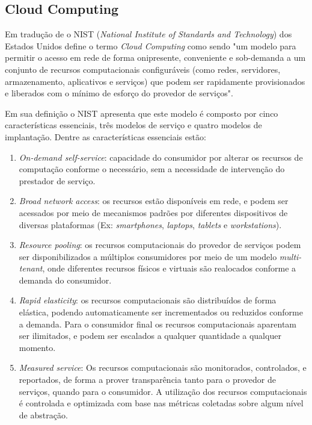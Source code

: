 \subsection{Cloud Computing}
Em tradução de \cite{2019:Sehgal} o NIST
(\emph{National Institute of Standards and Technology}) dos Estados Unidos
define o termo \emph{Cloud Computing} como sendo "um modelo para permitir
o acesso em rede de forma onipresente, conveniente e sob-demanda
a um conjunto de recursos computacionais configuráveis (como redes,
servidores, armazenamento, aplicativos e serviços) que podem ser
rapidamente provisionados e liberados com o mínimo de esforço do provedor
de serviços".

Em sua definição o NIST apresenta que este modelo é composto
por cinco características essenciais, três modelos de serviço e
quatro modelos de implantação. Dentre as características essenciais
estão:
\begin{enumerate}
    \item \emph{On-demand self-service}: capacidade do consumidor
          por alterar os recursos de computação conforme o necessário,
          sem a necessidade de intervenção do prestador de serviço.

    \item \emph{Broad network access}: os recursos estão disponíveis
          em rede, e podem ser acessados por meio de mecanismos padrões por
          diferentes dispositivos de diversas plataformas (Ex: \emph{smartphones},
          \emph{laptops}, \emph{tablets} e \emph{workstations}).

    \item \emph{Resource pooling}: os recursos computacionais do provedor
          de serviços podem ser disponibilizados a múltiplos consumidores
          por meio de um modelo \emph{multi-tenant}, onde diferentes recursos
          físicos e virtuais são realocados conforme a demanda do consumidor.

    \item \emph{Rapid elasticity}: os recursos computacionais são distribuídos
          de forma elástica, podendo automaticamente ser incrementados ou reduzidos
          conforme a demanda. Para o consumidor final os recursos computacionais
          aparentam ser ilimitados, e podem ser escalados a qualquer quantidade
          a qualquer momento.

    \item \emph{Measured service}: Os recursos computacionais são monitorados,
          controlados, e reportados, de forma a prover transparência tanto para o provedor
          de serviços, quando para o consumidor. A utilização dos recursos computacionais
          é controlada e optimizada com base nas métricas coletadas sobre algum nível de abstração.
\end{enumerate}


